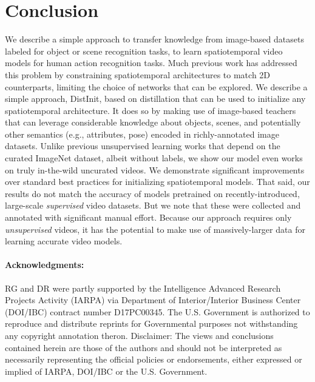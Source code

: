 \documentclass[10pt,twocolumn,letterpaper]{article}
\newcommand{\METHOD}[0]{DistInit}
\begin{document}
 \section{Conclusion}\label{sec:concl}

We describe a simple approach to transfer knowledge from image-based datasets labeled for object or scene recognition tasks, to learn spatiotemporal video models for human action recognition tasks. Much previous work has addressed this problem by constraining spatiotemporal architectures to match  2D counterparts, limiting the choice of networks that can be explored.  We describe a simple approach, \METHOD{}, based on distillation that can be used to initialize any spatiotemporal architecture. It does so by making use of image-based teachers that can leverage considerable knowledge about objects, scenes, and potentially other semantics (e.g., attributes, pose) encoded in richly-annotated image datasets.
Unlike previous unsupervised learning works that depend on the curated ImageNet dataset, albeit without labels, we show our model even works on truly in-the-wild uncurated videos.
We demonstrate significant improvements over standard best practices for initializing spatiotemporal models. That said, our results do not match the accuracy of models pretrained on recently-introduced, large-scale {\em supervised} video datasets. But we note that these were collected and annotated with significant manual effort. Because our approach requires only {\em unsupervised} videos, it has the potential to make use of massively-larger data for learning accurate video models.

{\small
\paragraph{Acknowledgments:}
RG and DR were partly supported by the Intelligence Advanced Research Projects Activity (IARPA) via Department of Interior/Interior Business Center (DOI/IBC) contract number D17PC00345. The U.S. Government is authorized to reproduce and distribute reprints for Governmental purposes not withstanding any copyright annotation theron. Disclaimer: The views and conclusions contained herein are those of the authors and should not be interpreted as necessarily representing the official policies or endorsements, either expressed or implied of IARPA, DOI/IBC or the U.S. Government.
} 
{\small


}
\end{document}
